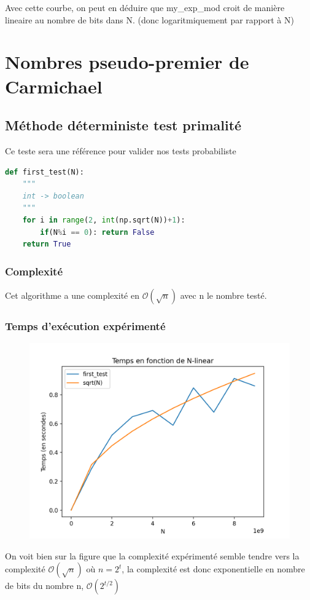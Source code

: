 \documentclass{article}
\begin{document}
Avec cette courbe, on peut en déduire que my\_exp\_mod croit de manière lineaire au nombre de bits dans N.
(donc logaritmiquement par rapport à N)
\section{Nombres pseudo-premier de Carmichael}

\subsection{Méthode déterministe test primalité}

Ce teste sera une référence pour valider nos tests probabiliste
\begin{lstlisting}[language=Python, caption=Implementation test primalité naïf]
def first_test(N):
    """
    int -> boolean
    """
    for i in range(2, int(np.sqrt(N))+1):
        if(N%i == 0): return False
    return True
\end{lstlisting}

\subsubsection{Complexité}
Cet algorithme a une complexité en $\mathcal{O}(\sqrt{n})$ avec n le nombre testé.

\subsubsection{Temps d'exécution expérimenté}

\begin{figure}[H]
    \centering
    \includegraphics[width=0.7\linewidth]{first_test.png}
    \caption{}
    \label{fig:first_test}
\end{figure}

On voit bien sur la figure que la complexité expérimenté semble tendre vers la complexité $\mathcal{O}(\sqrt{n})$
où $n = 2^t$, la complexité est donc exponentielle en nombre de bits du nombre n, $\mathcal{O}(2^{t/2})$
\end{document}
